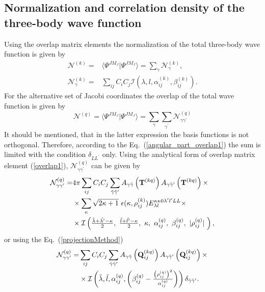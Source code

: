 \documentclass[12pt,a4paper,twoside]{article}
\begin{document}
\subsection{Normalization and correlation density of the three-body wave function}
Using the overlap matrix elements the normalization of the total three-body wave function is given by
\begin{align}
\mathcal{N}^{(k)}= & \langle \Psi^{JM_J} \vert \Psi^{JM_J} \rangle = \sum_{\gamma} \mathcal{N}^{(k)}_{\gamma},    \nonumber \\
 \mathcal{N}^{(k)}_{\gamma} = & \sum_{ij} C_i C_j \mathcal{I} \left( \lambda,l,\alpha_{ij}^{(k)},\beta_{ij}^{(k)} \right).
\end{align}
For the alternative set of Jacobi coordinates the overlap of the total wave function is given by
\begin{equation}
\mathcal{N}^{(q)}= \langle \Psi^{JM_J} \vert \Psi^{JM_J} \rangle = \sum_{\gamma} \sum_{\gamma^{\prime}} \mathcal{N}^{(q)}_{\gamma \gamma^{\prime}}
\end{equation}
It should be mentioned, that in the latter expression the basis functions is not orthogonal. Therefore, according to the Eq.~(\ref{angular_part_overlap1}) the sum is limited with the condition $\delta_{LL^{\prime}}$ only. Using the analytical form  of overlap matrix element (\ref{overlap1}), $\mathcal{N}^{(q)}_{\gamma \gamma^{\prime}}$ can be given by
\begin{align}
\mathcal{N}^{(q)}_{\gamma \gamma^{\prime}}= & 4 \pi \sum_{ij} C_i C_j \sum_{\tilde{\gamma}\tilde{\gamma}^{\prime}}  A_{\gamma\tilde{\gamma}}\left( {\bf T}^{(kq)} \right) A_{\gamma\tilde{\gamma}^{\prime}}\left( {\bf T}^{(kq)} \right) \times
\nonumber \\
 & \times \sum_{\kappa} \sqrt{2\kappa+1}~ \epsilon(\kappa, \rho^{(k)}_{ij}) {E}^{\kappa \kappa 0 \lambda^{\prime} l^{\prime} L L}_{\lambda l} \times  \nonumber 
 \\ & \times \mathcal{I}\left(
 \tfrac{\tilde{\lambda}+\tilde{\lambda^{\prime}}-\kappa}{2}, ~
 \tfrac{\tilde{l}+\tilde{l^{\prime}}-\kappa}{2},~
 \kappa,~
 \alpha^{(q)}_{ij},~
 \beta^{(q)}_{ij} ,~
 \vert \rho^{(q)}_{ij} \vert ~
  \right),
\end{align}
or using the Eq.~(\ref{projectionMethod})
\begin{align}
\mathcal{N}^{(q)}_{\gamma \gamma^{\prime}}= & \sum_{ij} C_i C_j  \sum_{\tilde{\gamma}\tilde{\gamma}^{\prime}}
A_{\gamma\tilde{\gamma}}\left( {\bf Q}_{ij}^{(kq)} \right)
 A_{\gamma\tilde{\gamma}^{\prime}}\left( {\bf Q}_{ij}^{(kq)} \right) \times\nonumber \\
 & \times
  \mathcal{I} \left( \tilde{\lambda}, \tilde{l}, \alpha^{(q)}_{ij}, \left(  \beta^{(q)}_{ij} - \tfrac{\left(\rho^{(q)}_{ij}\right)^2}{\alpha^{(q)}_{ij}} \right) \right) \delta_{\tilde{\gamma}\tilde{\gamma}^{\prime}}.
\end{align}  
\end{document}
